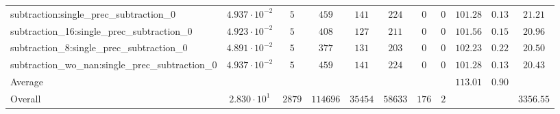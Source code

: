 \begin{tabular}{|l|c|c|c|c|c|c|c|c|c|c|}
subtraction:single\_prec\_subtraction\_0                  & $ 4.937 \cdot 10^{-2} $ & $ 5      $ & $ 459    $ & $ 141   $ & $ 224   $ & $ 0   $ & $ 0 $ & $ 101.28      $ & $ 0.13    $ & $ 21.21   $ \\
subtraction\_16:single\_prec\_subtraction\_0              & $ 4.923 \cdot 10^{-2} $ & $ 5      $ & $ 408    $ & $ 127   $ & $ 211   $ & $ 0   $ & $ 0 $ & $ 101.56      $ & $ 0.15    $ & $ 20.96   $ \\
subtraction\_8:single\_prec\_subtraction\_0               & $ 4.891 \cdot 10^{-2} $ & $ 5      $ & $ 377    $ & $ 131   $ & $ 203   $ & $ 0   $ & $ 0 $ & $ 102.23      $ & $ 0.22    $ & $ 20.50   $ \\
subtraction\_wo\_nan:single\_prec\_subtraction\_0         & $ 4.937 \cdot 10^{-2} $ & $ 5      $ & $ 459    $ & $ 141   $ & $ 224   $ & $ 0   $ & $ 0 $ & $ 101.28      $ & $ 0.13    $ & $ 20.43   $ \\
\hline
Average                                                   & $                     $ & $        $ & $        $ & $       $ & $       $ & $     $ & $   $ & $ 113.01      $ & $ 0.90    $ & $         $ \\
\hline
Overall                                                   & $ 2.830 \cdot 10^{1}  $ & $ 2879   $ & $ 114696 $ & $ 35454 $ & $ 58633 $ & $ 176 $ & $ 2 $ & $             $ & $         $ & $ 3356.55 $ \\
\hline
\end{tabular}
